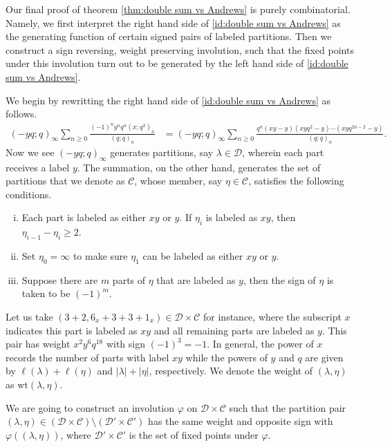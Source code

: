 \documentclass[11pt,reqno]{amsart}
\numberwithin{equation}{section}
\theoremstyle{plain}
\theoremstyle{definition}
\theoremstyle{named}
\newcommand{\abs}[1]{\left|#1\right|}
\def\cD{\mathcal{D}}
\def\cC{\mathcal{C}}
\def\la{\lambda}
\def\wt{\mathrm{wt}}
\begin{document}
Our final proof of theorem \ref{thm:double sum vs Andrews} is purely combinatorial. Namely, we first interpret the right hand side of \eqref{id:double sum vs Andrews} as the generating function of certain signed pairs of labeled partitions. Then we construct a sign reversing, weight preserving involution, such that the fixed points under this involution turn out to be generated by the left hand side of \eqref{id:double sum vs Andrews}.

We begin by rewritting the right hand side of \eqref{id:double sum vs Andrews} as follows.
\begin{align*}
(-yq; q)_{\infty}\sum_{n\geq 0}\frac{(-1)^ny^nq^n(x; q^{2})_{n}}{(q; q)_{n}}
&=(-yq; q)_{\infty}\sum_{n\geq 0}\frac{q^n(xy-y)(xyq^2-y)\cdots (xyq^{2n-2}-y)}{(q; q)_{n}}.
\end{align*}
Now we see $(-yq; q)_{\infty}$ generates partitions, say $\lambda\in\cD$, wherein each part receives a label $y$. The summation, on the other hand, generates the set of partitions that we denote as $\cC$, whose member, say $\eta\in\cC$, satisfies the following conditions.
\begin{enumerate}[(i)]
\item Each part is labeled as either $xy$ or $y$. If $\eta_{i}$ is labeled as $xy$, then $\eta_{i-1}-\eta_{i}\geq 2$. 

\item Set $\eta_{0}=\infty$ to make sure $\eta_{1}$ can be labeled as either $xy$ or $y$. 

\item Suppose there are $m$ parts of $\eta$ that are labeled as $y$, then the sign of $\eta$ is taken to be $(-1)^m$. 
\end{enumerate}

Let us take $(3+2,6_x+3+3+1_x)\in\cD\times\cC$ for instance, where the subscript $x$ indicates this part is labeled as $xy$ and all remaining parts are labeled as $y$. This pair has weight $x^2y^6q^{18}$ with sign $(-1)^3=-1$. In general, the power of $x$ records the number of parts with label $xy$ while the powers of $y$ and $q$ are given by $\ell(\la)+\ell(\eta)$ and $\abs{\la}+\abs{\eta}$, respectively. We denote the weight of $(\la,\eta)$ as $\wt(\la,\eta)$.

We are going to construct an involution $\varphi$ on $\cD\times\cC$ such that the partition pair $(\la, \eta)\in (\cD\times\cC)\setminus (\cD'\times\cC')$ has the same weight and opposite sign with $\varphi((\la, \eta))$, where $\cD'\times\cC'$ is the set of fixed points under $\varphi$. 
\end{document}
